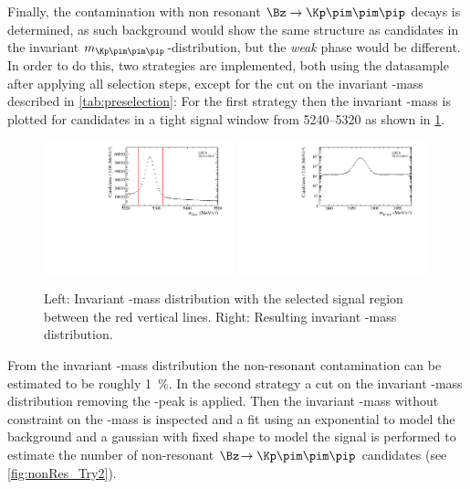 Finally, the contamination with non resonant $\Bz\to\Kp\pim\pim\pip$ decays is determined, as such background would show the same structure as \BdToDpi candidates in the invariant $m_{\Kp\pim\pim\pip}$-distribution, but the \emph{weak} phase would be different.
In order to do this, two strategies are implemented, both using the datasample after applying all selection steps, except for the cut on the invariant \Dm-mass described in \cref{tab:preselection}:
For the first strategy then the invariant \Dm-mass is plotted for candidates in a tight \Bz signal window from \SIrange[per-mode=symbol]{5240}{5320}{\MeVcc} as shown in \cref{fig:nonRes_Try1}.
\begin{figure}[tbp]
    \centering
    \includegraphics[width=0.49\textwidth]{06selection/figs/BmassCut.pdf}
    \includegraphics[width=0.49\textwidth]{06selection/figs/Resulting_Dmass.pdf}
    \caption{Left: Invariant \Bz-mass distribution with the selected signal region between the red vertical lines.
    Right: Resulting invariant \Dm-mass distribution.}
    \label{fig:nonRes_Try1}
\end{figure}
From the invariant \Dm-mass distribution the non-resonant contamination can be estimated to be roughly \SI{1}{\percent}.
In the second strategy a cut on the invariant \Dm-mass distribution removing the \Dm-peak is applied.
Then the invariant \Bz-mass without constraint on the \Dm-mass is inspected and a fit using an exponential to model the background and a gaussian with fixed shape to model the signal is performed to estimate the number of non-resonant $\Bz\!\to\Kp\pim\pim\pip$ candidates (see \cref{fig:nonRes_Try2}).
